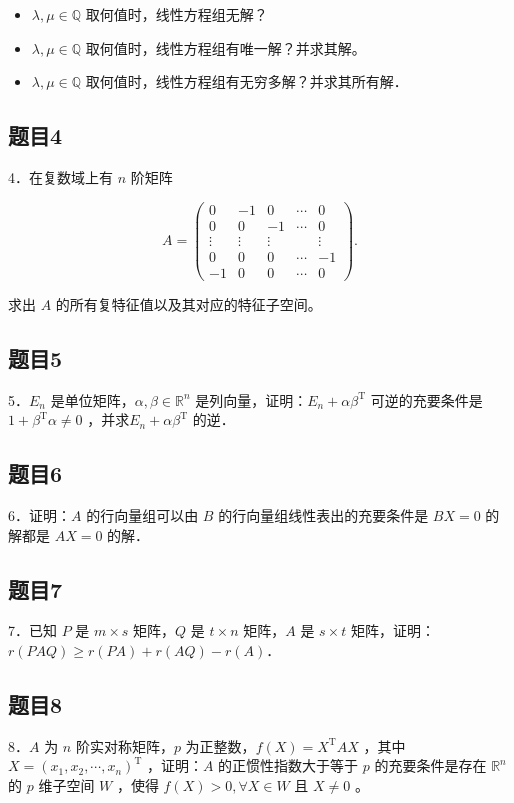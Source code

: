 \documentclass{article}
\begin{document}
\begin{itemize}
  \item[（1）] \(\lambda, \mu \in \mathbb{Q}\) 取何值时，线性方程组无解？
  \item[（2）] \(\lambda, \mu \in \mathbb{Q}\) 取何值时，线性方程组有唯一解？并求其解。
  \item[（3）] \(\lambda, \mu \in \mathbb{Q}\) 取何值时，线性方程组有无穷多解？并求其所有解．
\end{itemize}

\subsection{题目4}
4．在复数域上有 \(n\) 阶矩阵

\[
A=\left(\begin{array}{ccccc}
0 & -1 & 0 & \cdots & 0 \\
0 & 0 & -1 & \cdots & 0 \\
\vdots & \vdots & \vdots & & \vdots \\
0 & 0 & 0 & \cdots & -1 \\
-1 & 0 & 0 & \cdots & 0
\end{array}\right) .
\]

求出 \(A\) 的所有复特征值以及其对应的特征子空间。

\subsection{题目5}
5．\(E_{n}\) 是单位矩阵，\(\alpha, \beta \in \mathbb{R}^{n}\) 是列向量，证明：\(E_{n}+\alpha \beta^{\mathrm{T}}\) 可逆的充要条件是 \(1+\beta^{\mathrm{T}} \alpha \neq 0\) ，并求\(E_{n}+\alpha \beta^{\mathrm{T}}\) 的逆．

\subsection{题目6}
6．证明：\(A\) 的行向量组可以由 \(B\) 的行向量组线性表出的充要条件是 \(B X=0\) 的解都是 \(A X=0\) 的解．

\subsection{题目7}
7．已知 \(P\) 是 \(m \times s\) 矩阵，\(Q\) 是 \(t \times n\) 矩阵，\(A\) 是 \(s \times t\) 矩阵，证明：\(r(P A Q) \geq r(P A)+r(A Q)-r(A)\)．

\subsection{题目8}
8．\(A\) 为 \(n\) 阶实对称矩阵，\(p\) 为正整数，\(f(X)=X^{\mathrm{T}} A X\) ，其中 \(X=\left(x_{1}, x_{2}, \cdots, x_{n}\right)^{\mathrm{T}}\) ，证明：\(A\) 的正惯性指数大于等于 \(p\) 的充要条件是存在 \(\mathbb{R}^{n}\) 的 \(p\) 维子空间 \(W\) ，使得 \(f(X)>0, \forall X \in W\) 且 \(X \neq 0\) 。
\end{document}
